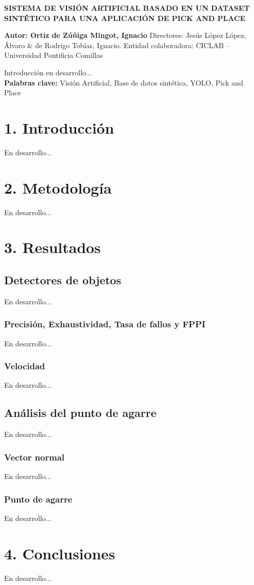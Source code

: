 {\setlength{\parindent}{0pt}
\begin{Large}
\textbf{SISTEMA DE VISIÓN ARTIFICIAL BASADO EN UN DATASET SINTÉTICO PARA UNA APLICACIÓN DE PICK AND PLACE}
\end{Large}

\textbf{Autor: Ortiz de Zúñiga Mingot, Ignacio}\newline
Directores: Jesús López López, Álvaro \& de Rodrigo Tobías, Ignacio.\newline
Entidad colaboradora: CICLAB – Universidad Pontificia Comillas\newline


Introducción en desarrollo...\\
\textbf{Palabras clave:} Visión Artificial, Base de datos sintética, YOLO, Pick and Place

\section*{1. Introducción}
En desarrollo...

\section*{2. Metodología}
En desarrollo...

\section*{3. Resultados}
\subsection*{Detectores de objetos}
En desarrollo...

\subsubsection*{Precisión, Exhaustividad, Tasa de fallos y FPPI}
En desarrollo...

\subsubsection*{Velocidad}
En desarrollo...

\subsection*{Análisis del punto de agarre}
En desarrollo...

\subsubsection*{Vector normal}
En desarrollo...

\subsubsection*{Punto de agarre}
En desarrollo...

\section*{4. Conclusiones}
En desarrollo...
}